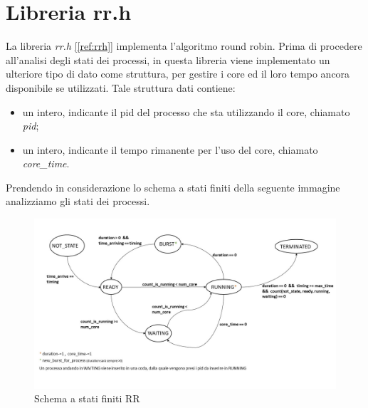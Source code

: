 \documentclass[Lau, oneside]{sapthesis}%
\begin{document}
\section{Libreria rr.h}
\label{sec:rr.h}
La libreria \textit{rr.h} \hyperref[ref:rrh]{[\ref*{ref:rrh}]} implementa l'algoritmo round robin.
Prima di procedere all'analisi degli stati dei processi, in questa libreria viene implementato un ulteriore tipo di dato come struttura, per gestire i core ed il loro tempo ancora disponibile se utilizzati.
Tale struttura dati contiene:
\begin{itemize}
    \item un intero, indicante il pid del processo che sta utilizzando il core, chiamato \textit{pid};
    \item un intero, indicante il tempo rimanente per l'uso del core, chiamato \textit{core\_time}.
\end{itemize}
Prendendo in considerazione lo schema a stati finiti della seguente immagine analizziamo gli stati dei processi.
\begin{figure}[h]
  \centering
  \includegraphics[width=1\textwidth]{schema a stati finiti RR.JPG}
  \caption{Schema a stati finiti RR}
\end{figure}
\end{document}
